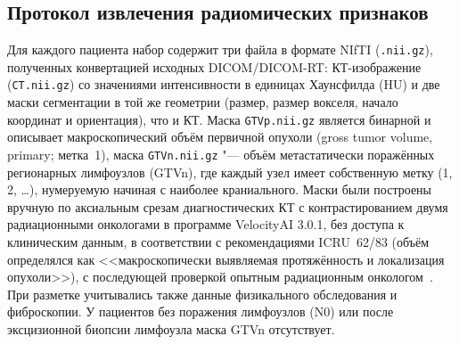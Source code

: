 \documentclass[11pt,a4paper]{article}
\begin{document}
\subsection{Протокол извлечения радиомических признаков}

Для каждого пациента набор содержит три файла в формате NIfTI (\texttt{.nii.gz}), полученных конвертацией исходных DICOM/DICOM-RT: КТ-изображение (\texttt{CT.nii.gz}) со значениями интенсивности в единицах Хаунсфилда (HU) и две маски сегментации в той же геометрии (размер, размер вокселя, начало координат и ориентация), что и КТ. Маска \texttt{GTVp.nii.gz} является бинарной и описывает макроскопический объём первичной опухоли (gross tumor volume, primary; метка~1), маска \texttt{GTVn.nii.gz} "--- объём метастатически поражённых регионарных лимфоузлов (GTVn), где каждый узел имеет собственную метку (1, 2, \ldots), нумеруемую начиная с наиболее краниального. Маски были построены вручную по аксиальным срезам диагностических КТ с контрастированием двумя радиационными онкологами в программе VelocityAI 3.0.1, без доступа к клиническим данным, в соответствии с рекомендациями ICRU~62/83 (объём определялся как <<макроскопически выявляемая протяжённость и локализация опухоли>>), с последующей проверкой опытным радиационным онкологом~\cite{elhalawani2017}. При разметке учитывались также данные физикального обследования и фиброскопии. У пациентов без поражения лимфоузлов (N0) или после эксцизионной биопсии лимфоузла маска GTVn отсутствует.
\end{document}
